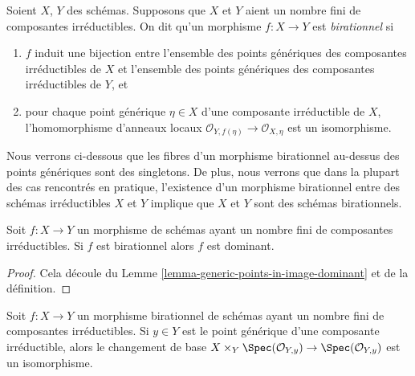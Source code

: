 \begin{definition}
\label{definition-birational}
\begin{reference}
\cite[(2.2.9)]{EGA1}
\end{reference}
Soient $X$, $Y$ des schémas. Supposons que $X$ et $Y$ aient un nombre
fini de composantes irréductibles. On dit qu'un morphisme $f : X \to Y$ est {\it
birationnel} si
\begin{enumerate}
\item $f$ induit une bijection entre l'ensemble des points génériques des
composantes irréductibles de $X$ et l'ensemble des points génériques
des composantes irréductibles de $Y$, et
\item pour chaque point générique $\eta \in X$ d'une composante irréductible
de $X$,
l'homomorphisme d'anneaux locaux $\mathcal{O}_{Y, f(\eta)} \to \mathcal{O}_{X, \eta}$ est un
isomorphisme.
\end{enumerate}
\end{definition}

\noindent
Nous verrons ci-dessous que les fibres d'un morphisme birationnel au-dessus
des points génériques sont des singletons. De plus, nous verrons que dans la
plupart des cas rencontrés en pratique, l'existence d'un morphisme birationnel entre des schémas irréductibles
$X$ et $Y$ implique que $X$ et
$Y$ sont des schémas birationnels.

\begin{lemma}
\label{lemma-birational-dominant}
Soit $f : X \to Y$ un morphisme de schémas ayant un nombre fini de composantes
irréductibles. Si $f$ est birationnel alors $f$
est dominant.
\end{lemma}

\begin{proof}
Cela découle du Lemme \ref{lemma-generic-points-in-image-dominant} et de la
définition.
\end{proof}

\begin{lemma}
\label{lemma-birational-generic-fibres}
Soit $f : X \to Y$ un morphisme birationnel de schémas ayant un
nombre fini de composantes irréductibles. Si $y \in Y$
est le point générique d'une composante
irréductible, alors le changement de base $X \times_Y \Spec(\mathcal{O}_{Y, y}) \to \Spec(\mathcal{O}_{Y, y})$ est un
isomorphisme.
\end{lemma}

